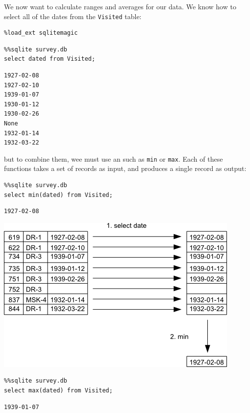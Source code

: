 \documentclass{book}
\begin{document}
We now want to calculate ranges and averages for our data. We know how
to select all of the dates from the \texttt{Visited} table:

\begin{verbatim}
%load_ext sqlitemagic
\end{verbatim}

\begin{verbatim}
%%sqlite survey.db
select dated from Visited;
\end{verbatim}

\begin{verbatim}
1927-02-08
1927-02-10
1939-01-07
1930-01-12
1930-02-26
None
1932-01-14
1932-03-22
\end{verbatim}

but to combine them, wee must use an
 such as
\texttt{min} or \texttt{max}. Each of these functions takes a set of
records as input, and produces a single record as output:

\begin{verbatim}
%%sqlite survey.db
select min(dated) from Visited;
\end{verbatim}

\begin{verbatim}
1927-02-08
\end{verbatim}

\includegraphics{novice/sql/img/sql-aggregation.png}

\begin{verbatim}
%%sqlite survey.db
select max(dated) from Visited;
\end{verbatim}

\begin{verbatim}
1939-01-07
\end{verbatim}
\end{document}
